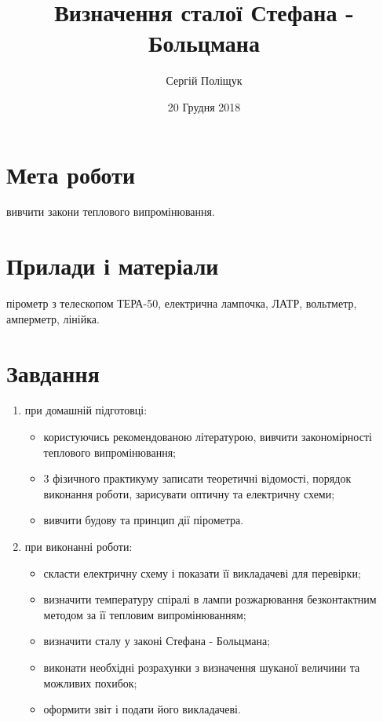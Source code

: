 \documentclass[twocolumn]{el-author}
\date{20 Грудня 2018}
\begin{document}
\title{Визначення сталої Стефана - Больцмана}

\author{Сергій Поліщук}


\maketitle

\section{Мета роботи}

вивчити закони теплового випромінювання. 

\section{Прилади і матеріали}

пірометр з телескопом ТЕРА-50, електрична
лампочка, ЛАТР, вольтметр, амперметр, лінійка.

\section{Завдання}

\begin{enumerate}
	\item при домашній підготовці:
	\begin{itemize}
		\item  користуючись рекомендованою літературою, вивчити
			закономірності теплового випромінювання;
		\item  3 фізичного практикуму записати теоретичні відомості,
			порядок виконання роботи, зарисувати оптичну та електричну
			схеми;
		\item  вивчити будову та принцип дії пірометра.
	\end{itemize}
	\item при виконанні роботи:
	\begin{itemize}
		\item  скласти електричну схему і показати її викладачеві для
			перевірки;
		\item  визначити температуру спіралі в лампи розжарювання
			безконтактним методом за її тепловим випромінюванням;
		\item  визначити сталу у законі Стефана - Больцмана;
		\item  виконати необхідні розрахунки з визначення шуканої
			величини та можливих похибок;
		\item  оформити звіт і подати його викладачеві.
	\end{itemize}
	
\end{enumerate}
\end{document}
